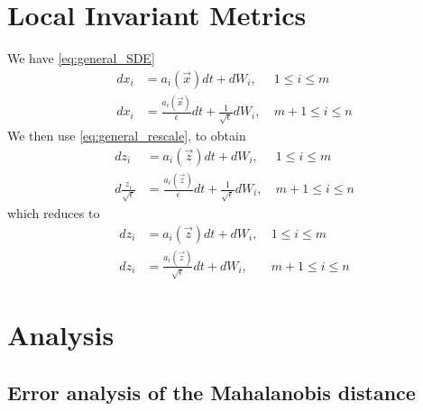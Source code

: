 \documentclass[12pt]{article}
\begin{document}
\section{Local Invariant Metrics}

We have \eqref{eq:general_SDE}
\begin{equation}
\begin{aligned}
dx_i &= a_i(\vec{x}) dt + dW_i, & \: 1 \le i \le m \\
dx_i &= \frac{a_i(\vec{x})}{\epsilon} dt + \frac{1}{\sqrt{\epsilon}} dW_i , & \: m+1 \le i \le n
\end{aligned}
\end{equation}
%
We then use \eqref{eq:general_rescale}, to obtain
%
\begin{equation}
\begin{aligned}
d z_i &= a_i(\vec{z}) dt + dW_i, & \: 1 \le i \le m \\
d \frac{z_i}{\sqrt{\epsilon}} &= \frac{a_i(\vec{z})}{\epsilon} dt + \frac{1}{\sqrt{\epsilon}} dW_i , & \: m+1 \le i \le n
\end{aligned}
\end{equation}
%
which reduces to
%
\begin{equation}
\begin{aligned}
d z_i &= a_i(\vec{z}) dt + dW_i, & \: 1 \le i \le m \\
d z_i &= \frac{a_i(\vec{z})}{\sqrt{\epsilon}} dt + dW_i , & \: m+1 \le i \le n
\end{aligned}
\end{equation}

\section{Analysis}

\subsection{Error analysis of the Mahalanobis distance}
\end{document}
